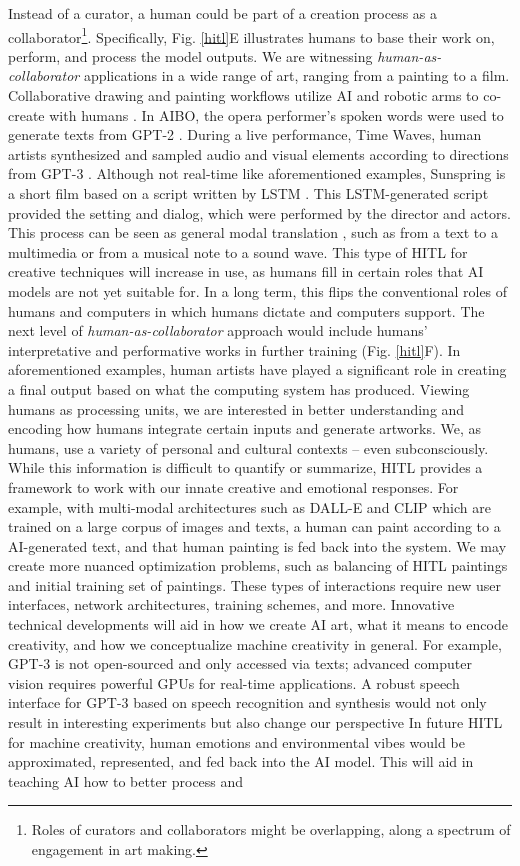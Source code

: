 \documentclass[letterpaper]{article} %
\begin{document}
Instead of a curator, a human could be part of a creation process as a collaborator\footnote{Roles of curators and collaborators might be overlapping, along a spectrum of engagement in art making.}. Specifically, Fig. \ref{hitl}E illustrates humans to base their work on, perform, and process the model outputs. We are witnessing \emph{human-as-collaborator} applications in a wide range of art, ranging from a painting to a film. Collaborative drawing and painting workflows utilize AI and robotic arms to co-create with humans \cite{Jansen2021}. In AIBO, the opera performer's spoken words were used to generate texts from GPT-2 \cite{Pearlman2021}. During a live performance, Time Waves, human artists synthesized and sampled audio and visual elements according to directions from GPT-3 \cite{TimeWaves}. Although not real-time like aforementioned examples, Sunspring \cite{Sunspring} is a short film based on a script written by LSTM \cite{Hochreiter1997}. This LSTM-generated script provided the setting and dialog, which were performed by the director and actors. This process can be seen as general modal translation \cite{Specia2016}, such as from a text to a multimedia or from a musical note to a sound wave. This type of HITL for creative techniques will increase in use, as humans fill in certain roles that AI models are not yet suitable for. In a long term, this flips the conventional roles of humans and computers in which humans dictate and computers support.  The next level of \emph{human-as-collaborator} approach would include humans' interpretative and performative works in further training (Fig. \ref{hitl}F). In aforementioned examples, human artists have played a significant role in creating a final output based on what the computing system has produced. Viewing humans as processing units, we are interested in better understanding and encoding how humans integrate certain inputs and generate artworks. We, as humans, use a variety of personal and cultural contexts -- even subconsciously. While this information is difficult to quantify or summarize, HITL provides a framework to work with our innate creative and emotional responses. For example, with multi-modal architectures such as DALL-E \cite{Ramesh2021} and CLIP \cite{Radford2021} which are trained on a large corpus of images and texts, a human can paint according to a AI-generated text, and that human painting is fed back into the system. We may create more nuanced optimization problems, such as balancing of HITL paintings and initial training set of paintings.  These types of interactions require new user interfaces, network architectures, training schemes, and more. Innovative technical developments will aid in how we create AI art, what it means to encode creativity, and how we conceptualize machine creativity in general. For example, GPT-3 is not open-sourced and only accessed via texts; advanced computer vision requires powerful GPUs for real-time applications. A robust speech interface for GPT-3 based on speech recognition and synthesis would not only result in interesting experiments but also change our perspective  In future HITL for machine creativity, human emotions and environmental vibes would be approximated, represented, and fed back into the AI model. This will aid in teaching AI how to better process and 
\end{document}

